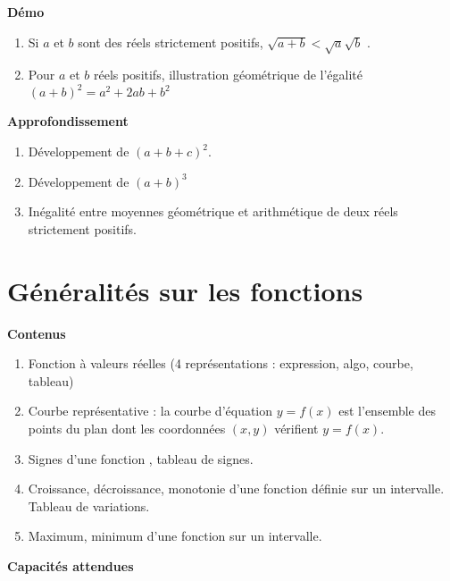 \documentclass[10pt,a4paper]{article}
\begin{document}
\textbf{Démo}

\begin{enumerate}
\item Si $a$ et $b$ sont des réels strictement positifs, $\sqrt{a+b} < \sqrt{a}\sqrt{b}$ .
\item Pour $a$ et $b$ réels positifs, illustration géométrique de l'égalité $(a + b)^2= a^2+ 2ab + b^2$
\end{enumerate}


\textbf{Approfondissement}

\begin{enumerate}
\item Développement de $(a + b + c)^2$.
\item Développement de $(a + b)^3$
\item Inégalité entre moyennes géométrique et arithmétique de deux réels strictement positifs.
\end{enumerate}



\section{Généralités sur les fonctions}

\textbf{Contenus}

\begin{enumerate}
\item Fonction à valeurs réelles (4 représentations : expression, algo, courbe, tableau)
\item Courbe représentative : la courbe d'équation $y = f(x)$ est l'ensemble des points du plan dont les coordonnées $(x,y)$ vérifient $y = f(x)$.
\item Signes d'une fonction , tableau de signes.
\item Croissance, décroissance, monotonie d'une fonction définie sur un intervalle. Tableau de variations.
\item Maximum, minimum d'une fonction sur un intervalle.
\end{enumerate}

\textbf{Capacités attendues}
\end{document}
